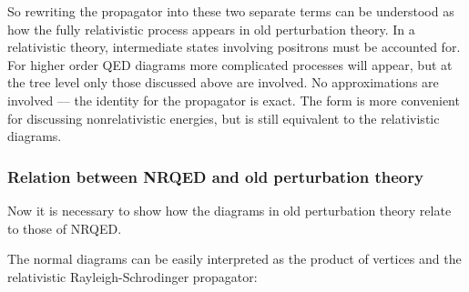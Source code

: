 So rewriting the propagator into these two separate terms can be understood as how the fully relativistic process appears in old perturbation theory.  In a relativistic theory, intermediate states involving positrons must be accounted for.  For higher order QED diagrams more complicated processes will appear, but at the tree level only those discussed above are involved.  No approximations are involved --- the identity for the propagator is exact.  The form is more convenient for discussing nonrelativistic energies, but is still equivalent to the relativistic diagrams.






\subsubsection{Relation between NRQED and old perturbation theory}
Now it is necessary to show how the diagrams in old perturbation theory relate to those of NRQED.  

The normal diagrams can be easily interpreted as the product of vertices and the relativistic Rayleigh-Schrodinger propagator:

